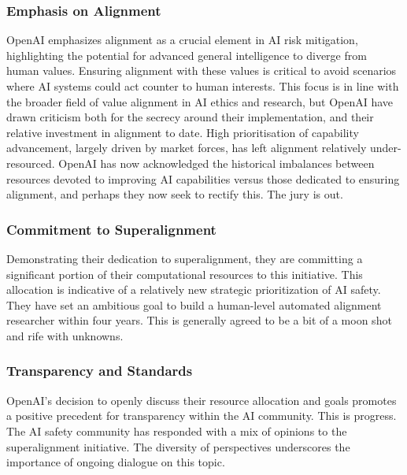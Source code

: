 \subsubsection{Emphasis on Alignment}
OpenAI emphasizes alignment as a crucial element in AI risk mitigation, highlighting the potential for advanced general intelligence to diverge from human values. Ensuring alignment with these values is critical to avoid scenarios where AI systems could act counter to human interests. This focus is in line with the broader field of value alignment in AI ethics and research, but OpenAI have drawn criticism both for the secrecy around their implementation, and their relative investment in alignment to date. High prioritisation of capability advancement, largely driven by market forces, has left alignment relatively under-resourced. OpenAI has now acknowledged the historical imbalances between resources devoted to improving AI capabilities versus those dedicated to ensuring alignment, and perhaps they now seek to rectify this. The jury is out.

\subsubsection{Commitment to Superalignment}
Demonstrating their dedication to superalignment, they are committing a significant portion of their computational resources to this initiative. This allocation is indicative of a relatively new strategic prioritization of AI safety.
They have set an ambitious goal to build a human-level automated alignment researcher within four years. This is generally agreed to be a bit of a moon shot and rife with unknowns.
\subsubsection{Transparency and Standards}
OpenAI's decision to openly discuss their resource allocation and goals promotes a positive precedent for transparency within the AI community. This is progress. The AI safety community has responded with a mix of opinions to the superalignment initiative. The diversity of perspectives underscores the importance of ongoing dialogue on this topic.

